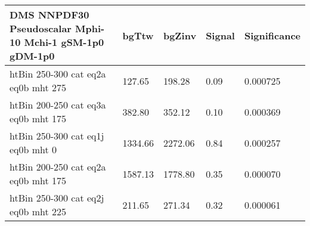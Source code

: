 \begin{tabular}{|l|l|l|l|l|}
\footnotesize
  \label{mostSensitiveBins_DMS_NNPDF30_Pseudoscalar_Mphi-10_Mchi-1_gSM-1p0_gDM-1p0_25ns}
	\textbf{DMS NNPDF30 Pseudoscalar Mphi-10 Mchi-1 gSM-1p0 gDM-1p0}	 & 	bgTtw	 & 	bgZinv	 & 	Signal &	 Significance \\ 
	\hline
	htBin 250-300 cat eq2a eq0b mht 275 & 	127.65	 & 	198.28	 & 	0.09 	&0.000725 \\ 
	htBin 200-250 cat eq3a eq0b mht 175 & 	382.80	 & 	352.12	 & 	0.10 	&0.000369 \\ 
	htBin 250-300 cat eq1j eq0b mht 0 & 	1334.66	 & 	2272.06	 & 	0.84 	&0.000257 \\ 
	htBin 200-250 cat eq2a eq0b mht 175 & 	1587.13	 & 	1778.80	 & 	0.35 	&0.000070 \\ 
	htBin 250-300 cat eq2j eq0b mht 225 & 	211.65	 & 	271.34	 & 	0.32 	&0.000061 \\ 
\end{tabular}

